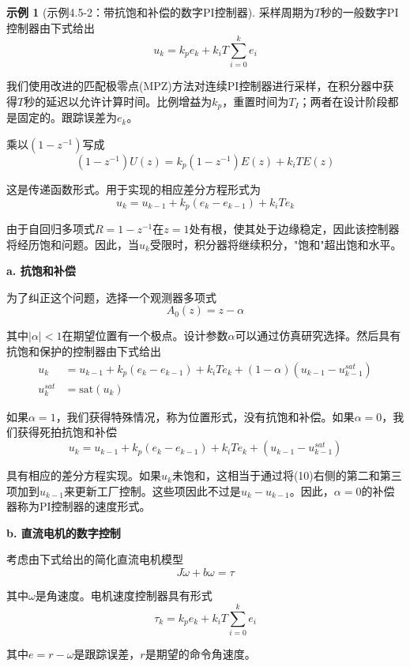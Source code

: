 \documentclass[UTF8]{ctexart}
\theoremstyle{definition}
\newtheorem{example}{示例}[section]
\begin{document}
\begin{example}[示例4.5-2：带抗饱和补偿的数字PI控制器]
采样周期为$T$秒的一般数字PI控制器由下式给出
\begin{equation*}
    u_k = k_p e_k + k_i T \sum_{i=0}^{k} e_i
\end{equation*}

我们使用改进的匹配极零点(MPZ)方法对连续PI控制器进行采样，在积分器中获得$T$秒的延迟以允许计算时间。比例增益为$k_p$，重置时间为$T_I$；两者在设计阶段都是固定的。跟踪误差为$e_k$。

乘以$(1-z^{-1})$写成
\begin{equation*}
    (1-z^{-1})U(z) = k_p(1-z^{-1})E(z) + k_i T E(z)
\end{equation*}

这是传递函数形式。用于实现的相应差分方程形式为
\begin{equation*}
    u_k = u_{k-1} + k_p(e_k - e_{k-1}) + k_i T e_k
\end{equation*}

由于自回归多项式$R=1-z^{-1}$在$z=1$处有根，使其处于边缘稳定，因此该控制器将经历饱和问题。因此，当$u_k$受限时，积分器将继续积分，"饱和"超出饱和水平。

\textbf{a. 抗饱和补偿}

为了纠正这个问题，选择一个观测器多项式
\begin{equation*}
    A_0(z) = z - \alpha
\end{equation*}

其中$|\alpha|<1$在期望位置有一个极点。设计参数$\alpha$可以通过仿真研究选择。然后具有抗饱和保护的控制器由下式给出
\begin{align*}
    u_k &= u_{k-1} + k_p(e_k - e_{k-1}) + k_i T e_k + (1-\alpha)(u_{k-1} - u_{k-1}^{sat}) \\
    u_k^{sat} &= \mathrm{sat}(u_k)
\end{align*}

如果$\alpha=1$，我们获得特殊情况，称为位置形式，没有抗饱和补偿。如果$\alpha=0$，我们获得死拍抗饱和补偿
\begin{equation*}
    u_k = u_{k-1} + k_p(e_k - e_{k-1}) + k_i T e_k + (u_{k-1} - u_{k-1}^{sat})
\end{equation*}

具有相应的差分方程实现。如果$u_k$未饱和，这相当于通过将(10)右侧的第二和第三项加到$u_{k-1}$来更新工厂控制。这些项因此不过是$u_k - u_{k-1}$。因此，$\alpha=0$的补偿器称为PI控制器的速度形式。

\textbf{b. 直流电机的数字控制}

考虑由下式给出的简化直流电机模型
\begin{equation*}
    J\dot{\omega} + b\omega = \tau
\end{equation*}

其中$\omega$是角速度。电机速度控制器具有形式
\begin{equation*}
    \tau_k = k_p e_k + k_i T \sum_{i=0}^{k} e_i
\end{equation*}

其中$e=r-\omega$是跟踪误差，$r$是期望的命令角速度。
\end{example}
\end{document}
